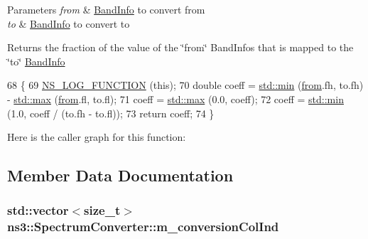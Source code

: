 \begin{DoxyParams}{Parameters}
{\em from} & \hyperlink{structns3_1_1BandInfo}{Band\+Info} to convert from \\
\hline
{\em to} & \hyperlink{structns3_1_1BandInfo}{Band\+Info} to convert to\\
\hline
\end{DoxyParams}
\begin{DoxyReturn}{Returns}
the fraction of the value of the \char`\"{}from\char`\"{} Band\+Infos that is mapped to the \char`\"{}to\char`\"{} \hyperlink{structns3_1_1BandInfo}{Band\+Info} 
\end{DoxyReturn}

\begin{DoxyCode}
68 \{
69   \hyperlink{log-macros-disabled_8h_a90b90d5bad1f39cb1b64923ea94c0761}{NS\_LOG\_FUNCTION} (\textcolor{keyword}{this});
70   \textcolor{keywordtype}{double} coeff = \hyperlink{80211b_8c_ac6afabdc09a49a433ee19d8a9486056d}{std::min} (\hyperlink{lte__amc_8m_a1b4c81ff74eb1a626b5ade44c81004b3}{from}.fh, to.fh) - \hyperlink{80211b_8c_affe776513b24d84b39af8ab0930fef7f}{std::max} (\hyperlink{lte__amc_8m_a1b4c81ff74eb1a626b5ade44c81004b3}{from}.fl, to.fl);
71   coeff = \hyperlink{80211b_8c_affe776513b24d84b39af8ab0930fef7f}{std::max} (0.0, coeff);
72   coeff = \hyperlink{80211b_8c_ac6afabdc09a49a433ee19d8a9486056d}{std::min} (1.0, coeff / (to.fh - to.fl));
73   \textcolor{keywordflow}{return} coeff;
74 \}
\end{DoxyCode}


Here is the caller graph for this function\+:




\subsection{Member Data Documentation}
\subsubsection[{\texorpdfstring{m\+\_\+conversion\+Col\+Ind}{m_conversionColInd}}]{\setlength{\rightskip}{0pt plus 5cm}std\+::vector$<$size\+\_\+t$>$ ns3\+::\+Spectrum\+Converter\+::m\+\_\+conversion\+Col\+Ind\hspace{0.3cm}{\ttfamily [private]}}\hypertarget{classns3_1_1SpectrumConverter_af316fdc8ed648d55b46fb7e6f52f7412}{}\label{classns3_1_1SpectrumConverter_af316fdc8ed648d55b46fb7e6f52f7412}


